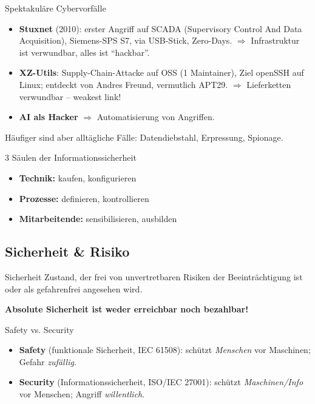 \documentclass[a4paper, fontsize=7pt]{scrartcl}
\begin{document}
\begin{subbox}{Spektakuläre Cybervorfälle}
\begin{itemize}
    \item \textbf{Stuxnet} (2010): erster Angriff auf SCADA (Supervisory Control And
          Data Acquisition), Siemens-SPS S7, via USB-Stick, Zero-Days.
          $\Rightarrow$ Infrastruktur ist verwundbar, alles ist ``hackbar''.
    \item \textbf{XZ-Utils}: Supply-Chain-Attacke auf OSS (1 Maintainer), Ziel openSSH
          auf Linux; entdeckt von Andres Freund, vermutlich APT29.
          $\Rightarrow$ Lieferketten verwundbar -- weakest link!
    \item \textbf{AI als Hacker} $\Rightarrow$ Automatisierung von Angriffen.
\end{itemize}
Häufiger sind aber alltägliche Fälle: Datendiebstahl, Erpressung, Spionage.
\end{subbox}

\begin{mainbox}{3 Säulen der Informationssicherheit}
\begin{itemize}
    \item \textbf{Technik:} kaufen, konfigurieren
    \item \textbf{Prozesse:} definieren, kontrollieren
    \item \textbf{Mitarbeitende:} sensibilisieren, ausbilden
\end{itemize}
\end{mainbox}

\subsection{Sicherheit \& Risiko}

\begin{mainbox}{Sicherheit}
Zustand, der frei von unvertretbaren Risiken der Beeinträchtigung ist oder als
gefahrenfrei angesehen wird.

\textbf{Absolute Sicherheit ist weder erreichbar noch bezahlbar!}
\end{mainbox}

\begin{mainbox}{Safety vs. Security}
\begin{itemize}
    \item \textbf{Safety} (funktionale Sicherheit, IEC 61508): schützt
          \emph{Menschen} vor Maschinen; Gefahr \emph{zufällig}.
    \item \textbf{Security} (Informationssicherheit, ISO/IEC 27001): schützt
          \emph{Maschinen/Info} vor Menschen; Angriff \emph{willentlich}.
\end{itemize}
\end{mainbox}
\end{document}
